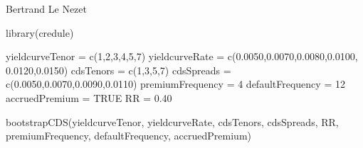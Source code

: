\documentclass[a4paper]{book}
\begin{document}
%
\begin{Author}\relax
Bertrand Le Nezet
\end{Author}
%
\begin{Examples}
\begin{ExampleCode}
library(credule)

yieldcurveTenor = c(1,2,3,4,5,7)
yieldcurveRate = c(0.0050,0.0070,0.0080,0.0100, 0.0120,0.0150)
cdsTenors = c(1,3,5,7)
cdsSpreads = c(0.0050,0.0070,0.0090,0.0110)
premiumFrequency = 4
defaultFrequency = 12
accruedPremium = TRUE
RR = 0.40

bootstrapCDS(yieldcurveTenor,
             yieldcurveRate,
             cdsTenors,
             cdsSpreads,
             RR,
             premiumFrequency,
             defaultFrequency,
             accruedPremium)
\end{ExampleCode}
\end{Examples}
\printindex{}
\end{document}
